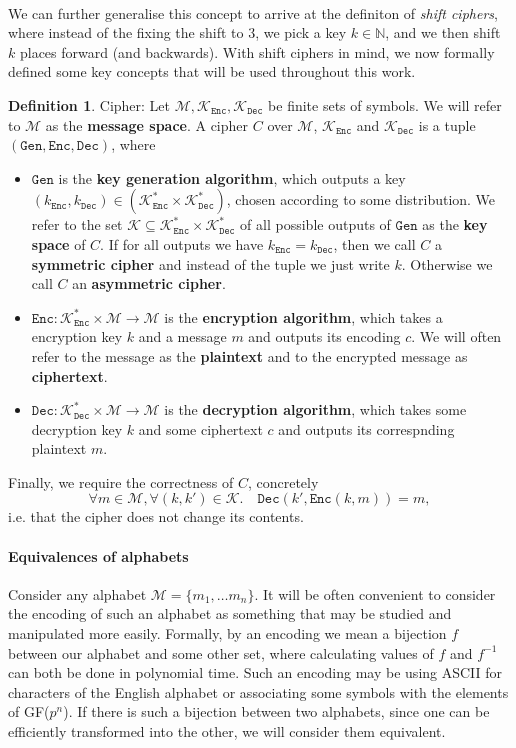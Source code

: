 \documentclass{article}
\theoremstyle{definition}
\newtheorem{definition}{Definition}[section]
\newcommand{\Enc}{\texttt{Enc}}
\newcommand{\Dec}{\texttt{Dec}}
\newcommand{\Gen}{\texttt{Gen}}
\newcommand{\M}{\mathcal{M}}
\newcommand{\K}{\mathcal{K}}
\begin{document}
\paragraph{}
We can further generalise this concept to arrive at the definiton of
\textit{shift ciphers}, where instead of the fixing the shift to 3, we pick a
key $k \in \mathbb{N}$, and we then shift $k$ places forward (and backwards).
With shift ciphers in mind, we now formally defined some key concepts that will
be used throughout this work.
\begin{definition}{Cipher:}
  Let $\M, \K_\Enc, \K_\Dec$ be finite sets of symbols. We will refer to $\M$
  as the \textbf{message space}.
  A cipher $C$ over $\M$, $\K_\Enc$ and $\K_\Dec$ is a tuple $(\Gen, \Enc, \Dec)$, where
  \begin{itemize}
  \item $\Gen$ is the \textbf{key generation algorithm}, which outputs a key
    $(k_\Enc, k_\Dec) \in (\K_\Enc^* \times \K_\Dec^*)$, chosen according to some
    distribution. We refer to the set $\K\subseteq \K_\Enc^* \times \K_\Dec^*$ of all possible outputs of $\Gen$ as the
    \textbf{key space} of $C$. If for all outputs we have $k_\Enc = k_\Dec$, then we call $C$
    a \textbf{symmetric cipher} and instead of the tuple we just write $k$.
    Otherwise we call $C$ an \textbf{asymmetric cipher}.
  \item $\Enc: \K_\Enc^*\times\M\to \M$ is the \textbf{encryption algorithm}, which takes
    a encryption key $k$ and a message $m$ and outputs its encoding $c$. We will often
    refer to the message as the \textbf{plaintext} and to the encrypted message
    as \textbf{ciphertext}.
  \item $\Dec: \K_\Dec^*\times\M \to \M$ is the \textbf{decryption algorithm}, which
    takes some decryption key $k$ and some ciphertext $c$ and outputs its
    correspnding plaintext $m$. 
  \end{itemize}
  Finally, we require the correctness of $C$, concretely
  \[
    \forall m \in \M, \forall (k, k') \in \K. \quad \Dec(k', \Enc(k, m)) = m,
  \]
  i.e. that the cipher does not change its contents.
\end{definition}

\paragraph{Equivalences of alphabets}
Consider any alphabet $\M = \{m_1, \hdots m_n\}$. It will be 
often convenient to consider the encoding of such an alphabet as something that
may be studied and manipulated more easily. Formally, by an encoding we mean a
bijection $f$ between our alphabet and some other set, where calculating values
of $f$ and $f^{-1}$ can both be done in polynomial time. Such an encoding may
be using ASCII for characters of the English alphabet or associating some
symbols with the elements of GF($p^n$). If there is such a bijection between
two alphabets, since one can be efficiently transformed into the other, we will
consider them equivalent.
\end{document}

